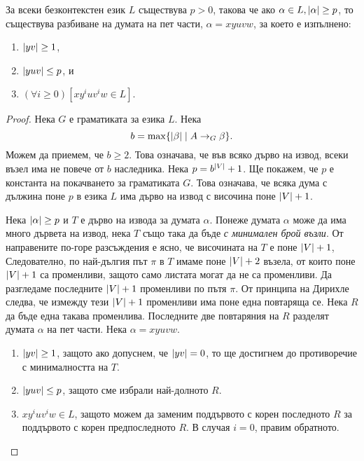 \begin{lemma}
  \label{lem:pumping-context} 
  За всеки безконтекстен език $L$ съществува $p>0$, такова
  че ако $\alpha\in L, \lvert{\alpha}\rvert \geq p$, то съществува разбиване на думата на пет части, $\alpha=xyuvw$,
  за което е изпълнено:
  \begin{enumerate}[1)]
  \item
    $\lvert{yv}\rvert\geq 1$,
  \item
    $\lvert{yuv}\rvert\leq p$, и
  \item
    $(\forall i\geq 0)[xy^iuv^iw\in L]$.
\end{enumerate}
\end{lemma}
\begin{proof}
  Нека $G$ е граматиката за езика $L$.
  Нека \[b = \max\{\lvert{\beta}\rvert \mid A\rightarrow_G \beta\}.\]
  Можем да приемем, че $b \geq 2$.
  Това означава, че във всяко дърво на извод, всеки възел има
  не повече от $b$ наследника.
  Нека $p = b^{\lvert{V}\rvert}+1$. Ще покажем, че $p$ е константа на покачването за граматиката $G$.
  Това означава, че всяка дума с дължина поне $p$ в езика $L$ има дърво на извод с височина
  поне $\lvert{V}\rvert + 1$.
  
  Нека $\lvert{\alpha}\rvert \geq p$ и $T$ е дърво на извода за думата $\alpha$.
  Понеже думата $\alpha$ може да има много дървета на извод, нека $T$ също така да бъде {\em с минимален брой възли}. 
  От направените по-горе разсъждения е ясно, че височината на $T$ е поне $\lvert{V}\rvert + 1$,
  Следователно, по най-дългия път $\pi$ в $T$ имаме поне $\lvert{V}\rvert+2$ възела, от които
  поне $\lvert{V}\rvert+1$ са променливи, защото само листата могат да не са променливи.
  Да разгледаме последните $\lvert{V}\rvert+1$ променливи по пътя $\pi$.
  От принципа на Дирихле следва, че измежду тези $\lvert{V}\rvert+1$ променливи има поне една повтаряща се.
  Нека $R$ да бъде една такава променлива.
  Последните две повтаряния на $R$ разделят думата $\alpha$ на пет части.
  Нека $\alpha = xyuvw$.
  \begin{enumerate}[1)]
  \item
    $\lvert{yv}\rvert\geq 1$,
    защото ако допуснем, че $\lvert{yv}\rvert = 0$,
    то ще достигнем до противоречие с минималността на $T$.
  \item
    $\lvert{yuv}\rvert \leq p$, защото сме избрали най-долното $R$.
  \item
    $xy^iuv^iw \in L$, защото можем да заменим поддървото 
    с корен последното $R$ за поддървото с корен предпоследното $R$.
    В случая $i = 0$, правим обратното.
  \end{enumerate}
\end{proof}

